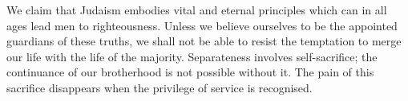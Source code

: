 We claim that Judaism embodies vital
and eternal principles which can in all ages
lead men to righteousness. Unless we
believe ourselves to be the appointed
guardians of these truths, we shall not be
able to resist the temptation to merge our
life with the life of the majority.
Separateness involves self-sacrifice; the continuance
of our brotherhood is not possible without it.
The pain of this sacrifice disappears when
the privilege of service is recognised.

